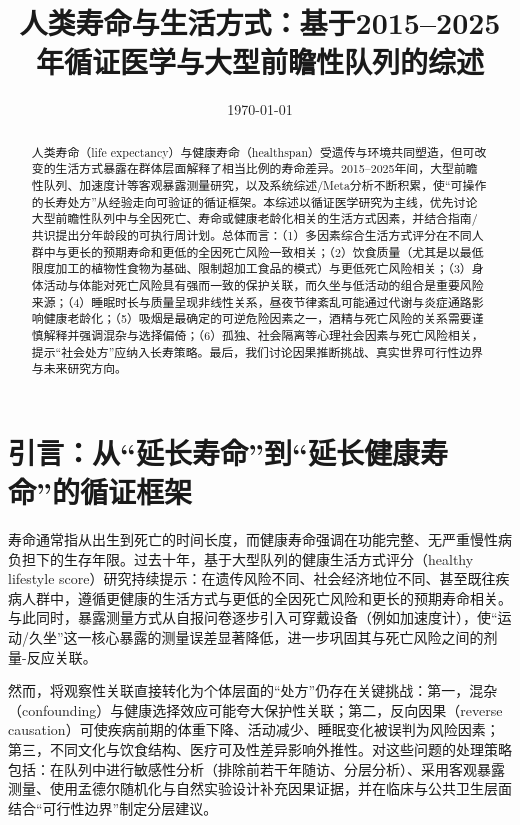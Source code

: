 \documentclass[11pt,a4paper]{article}
\title{人类寿命与生活方式：基于2015--2025年循证医学与大型前瞻性队列的综述}
\author{}
\date{\today}
\begin{document}
\maketitle
\tableofcontents
\newpage

\begin{abstract}
人类寿命（life expectancy）与健康寿命（healthspan）受遗传与环境共同塑造，但可改变的生活方式暴露在群体层面解释了相当比例的寿命差异。2015--2025年间，大型前瞻性队列、加速度计等客观暴露测量研究，以及系统综述/Meta分析不断积累，使“可操作的长寿处方”从经验走向可验证的循证框架。本综述以循证医学研究为主线，优先讨论大型前瞻性队列中与全因死亡、寿命或健康老龄化相关的生活方式因素，并结合指南/共识提出分年龄段的可执行周计划。总体而言：（1）多因素综合生活方式评分在不同人群中与更长的预期寿命和更低的全因死亡风险一致相关；（2）饮食质量（尤其是以最低限度加工的植物性食物为基础、限制超加工食品的模式）与更低死亡风险相关；（3）身体活动与体能对死亡风险具有强而一致的保护关联，而久坐与低活动的组合是重要风险来源；（4）睡眠时长与质量呈现非线性关系，昼夜节律紊乱可能通过代谢与炎症通路影响健康老龄化；（5）吸烟是最确定的可逆危险因素之一，酒精与死亡风险的关系需要谨慎解释并强调混杂与选择偏倚；（6）孤独、社会隔离等心理社会因素与死亡风险相关，提示“社会处方”应纳入长寿策略。最后，我们讨论因果推断挑战、真实世界可行性边界与未来研究方向。
\end{abstract}

\section{引言：从“延长寿命”到“延长健康寿命”的循证框架}

寿命通常指从出生到死亡的时间长度，而健康寿命强调在功能完整、无严重慢性病负担下的生存年限。过去十年，基于大型队列的健康生活方式评分（healthy lifestyle score）研究持续提示：在遗传风险不同、社会经济地位不同、甚至既往疾病人群中，遵循更健康的生活方式与更低的全因死亡风险和更长的预期寿命相关\cite{healthylifestyleand2023,associationofhealthy2021,plasmametabolitesof2023,associationofhealthy2020}。与此同时，暴露测量方式从自报问卷逐步引入可穿戴设备（例如加速度计），使“运动/久坐”这一核心暴露的测量误差显著降低，进一步巩固其与死亡风险之间的剂量-反应关联\cite{accelerometermeasuredphysical2020,sedentarytimeand2022,associationofdaily2020}。

然而，将观察性关联直接转化为个体层面的“处方”仍存在关键挑战：第一，混杂（confounding）与健康选择效应可能夸大保护性关联；第二，反向因果（reverse causation）可使疾病前期的体重下降、活动减少、睡眠变化被误判为风险因素；第三，不同文化与饮食结构、医疗可及性差异影响外推性。对这些问题的处理策略包括：在队列中进行敏感性分析（排除前若干年随访、分层分析）、采用客观暴露测量、使用孟德尔随机化与自然实验设计补充因果证据，并在临床与公共卫生层面结合“可行性边界”制定分层建议。
\end{document}
